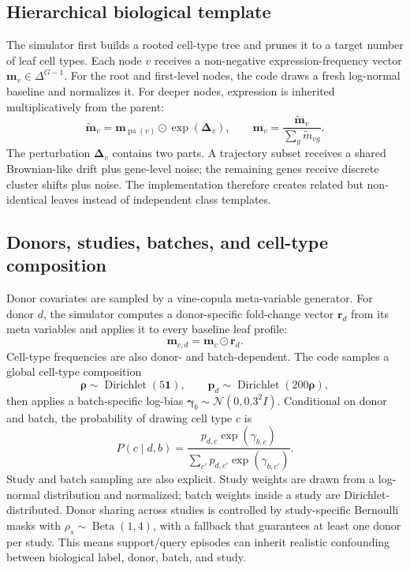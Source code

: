 \documentclass{article}
\begin{document}
\subsection{Hierarchical biological template}

The simulator first builds a rooted cell-type tree and prunes it to a target number of leaf cell types. Each node \(v\) receives a non-negative expression-frequency vector \(\mathbf{m}_v\in\Delta^{G-1}\). For the root and first-level nodes, the code draws a fresh log-normal baseline and normalizes it. For deeper nodes, expression is inherited multiplicatively from the parent:
\begin{equation}
    \tilde{\mathbf{m}}_v = \mathbf{m}_{\operatorname{pa}(v)} \odot \exp(\boldsymbol{\Delta}_v),
    \qquad
    \mathbf{m}_v = \frac{\tilde{\mathbf{m}}_v}{\sum_g \tilde{m}_{vg}}.
\end{equation}
The perturbation \(\boldsymbol{\Delta}_v\) contains two parts. A trajectory subset receives a shared Brownian-like drift plus gene-level noise; the remaining genes receive discrete cluster shifts plus noise. The implementation therefore creates related but non-identical leaves instead of independent class templates.

\subsection{Donors, studies, batches, and cell-type composition}

Donor covariates are sampled by a vine-copula meta-variable generator. For donor \(d\), the simulator computes a donor-specific fold-change vector \(\mathbf{r}_d\) from its meta variables and applies it to every baseline leaf profile:
\begin{equation}
    \mathbf{m}_{c,d} = \mathbf{m}_{c}\odot \mathbf{r}_d.
\end{equation}
Cell-type frequencies are also donor- and batch-dependent. The code samples a global cell-type composition
\begin{equation}
    \boldsymbol{\rho}\sim\operatorname{Dirichlet}(5\mathbf{1}),
    \qquad
    \mathbf{p}_d\sim\operatorname{Dirichlet}(200\boldsymbol{\rho}),
\end{equation}
then applies a batch-specific log-bias \(\boldsymbol{\gamma}_b\sim\mathcal{N}(0,0.3^2I)\). Conditional on donor and batch, the probability of drawing cell type \(c\) is
\begin{equation}
    P(c\mid d,b)=\frac{p_{d,c}\exp(\gamma_{b,c})}{\sum_{c'}p_{d,c'}\exp(\gamma_{b,c'})}.
\end{equation}
Study and batch sampling are also explicit. Study weights are drawn from a log-normal distribution and normalized; batch weights inside a study are Dirichlet-distributed. Donor sharing across studies is controlled by study-specific Bernoulli masks with \(\rho_s\sim\operatorname{Beta}(1,4)\), with a fallback that guarantees at least one donor per study. This means support/query episodes can inherit realistic confounding between biological label, donor, batch, and study.
\end{document}
